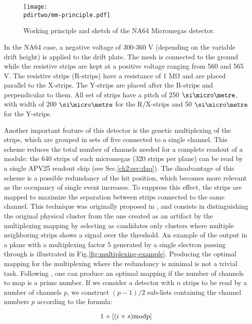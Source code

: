 \begin{figure}[bth!]
  \centering
  \texttt{[image: \\pdirtwo/mm-principle.pdf]}
\caption[Micromegas sketch]{Working principle and sketch of the NA64 Micromegas detector.}
\label{fig:mm-sketch}
\end{figure}

In the NA64 case, a negative voltage of 300-360 \si{\volt} (depending on the variable drift height) is applied to the drift plate. The mesh is connected to the ground while the resistive strips are kept at a positive voltage ranging from 560 and 565 \si{\volt}. The resistive strips (R-strips) have a resistance of 1 \si{\mega\ohm} and are placed parallel to the X-strips. The Y-strips are placed after the R-strips and perpendicular to them. All set of strips have a pitch of 250 $\mum$, with width of 200 $\mum$ for the R/X-strips and 50 $\mum$ for the Y-strips.

Another important feature of this detector is the genetic multiplexing of the strips, which are grouped in sets of five connected to a single channel. This scheme reduces the total number of channels needed for a complete readout of a module: the 640 strips of each micromegas (320 strips per plane) can be read by a single APV25 readout chip (see Sec.\ref{ch2:sec:daq}). The disadvantage of this scheme is a possible redundancy of the hit position, which becomes more relevant as the occupancy of single event increases. To suppress this effect, the strips are mapped to maximize the separation between strips connected to the same channel. This technique was originally proposed in \cite{Procureur:2013yea}, and consists in distinguishing the original physical cluster from the one created as an artifact by the multiplexing mapping by selecting as candidates only clusters where multiple neighboring strips shows a signal over the threshold. An example of the output in a plane with a multiplexing factor 5 generated by a single electron passing through is illustrated in Fig.\ref{fig:multiplexing-example}. Producing the optimal mapping for the multiplexing where the redundancy is minimal is not a trivial task. Following \cite{Procureur:2013yea}, one can produce an optimal mapping if the number of channels to map is a prime number. If we consider a detector with $n$ strips to be read by a number of channels $p$, we construct $(p-1)/2$ sub-lists containing the channel numbers $p$ according to the formula:

\begin{equation}
\label{eq:mm-multiplexing-mapping}
1 + [(i \times s) \rm{mod} p]
\end{equation}

